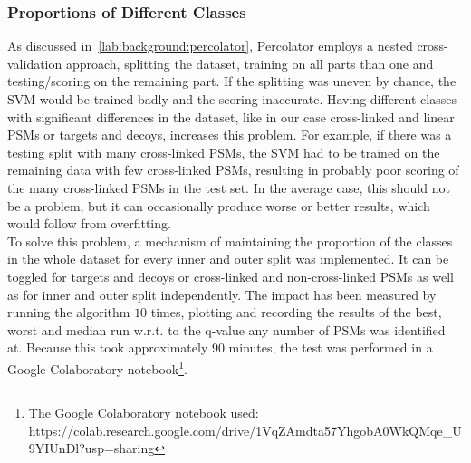 \subsubsection{Proportions of Different Classes}
\label{lab:matmet:proportions}
As discussed in~\ref{lab:background:percolator}, Percolator employs a nested cross-validation approach, splitting the dataset, training on all parts than one and testing/scoring on the remaining part. If the splitting was uneven by chance, the SVM would be trained badly and the scoring inaccurate. Having different classes with significant differences in the dataset, like in our case cross-linked and linear PSMs or targets and decoys, increases this problem. For example, if there was a testing split with many cross-linked PSMs, the SVM had to be trained on the remaining data with few cross-linked PSMs, resulting in probably poor scoring of the many cross-linked PSMs in the test set. In the average case, this should not be a problem, but it can occasionally produce worse or better results, which would follow from overfitting.\\
To solve this problem, a mechanism of maintaining the proportion of the classes in the whole dataset for every inner and outer split was implemented. It can be toggled for targets and decoys or cross-linked and non-cross-linked PSMs as well as for inner and outer split independently. The impact has been measured by running the algorithm $10$ times, plotting and recording the results of the best, worst and median run w.r.t. to the q-value any number of PSMs was identified at. Because this took approximately 90 minutes, the test was performed in a Google Colaboratory notebook\footnote{The Google Colaboratory notebook used:\\ https://colab.research.google.com/drive/1VqZAmdta57YhgobA0WkQMqe\_U9YIUnDl?usp=sharing}.
